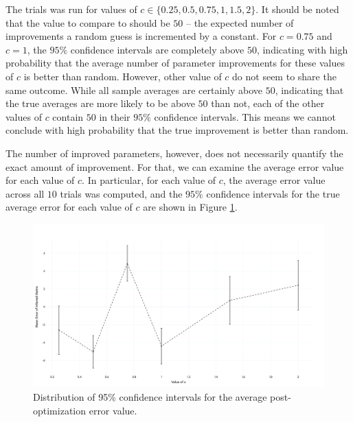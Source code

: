 \documentclass[12pt]{article}
\theoremstyle{definition}
\begin{document}
\newpage

The trials was run for values of $c \in \{0.25, 0.5, 0.75, 1, 1.5, 2\}$. It should be noted that the value to compare to should be $50$ -- the expected number of improvements a random guess is incremented by a constant. For $c=0.75$ and $c=1$, the $95\%$ confidence intervals are completely above $50$, indicating with high probability that the average number of parameter improvements for these values of $c$ is better than random. However, other value of $c$ do not seem to share the same outcome. While all sample averages are certainly above $50$, indicating that the true averages are more likely to be above $50$ than not, each of the other values of $c$ contain $50$ in their $95\%$ confidence intervals. This means we cannot conclude with high probability that the true improvement is better than random. 

The number of improved parameters, however, does not necessarily quantify the exact amount of improvement. For that, we can examine the average error value for each value of $c$. In particular, for each value of $c$, the average error value across all $10$ trials was computed, and the $95\%$ confidence intervals for the true average error for each value of $c$ are shown in Figure \ref{fig:erroBarOptimError}.

\begin{figure}[hbt!]
    \par
    \begin{center}
    \caption{Distribution of 95\% confidence intervals for the average post-optimization error value.}
    \label{fig:erroBarOptimError}
    \includegraphics[scale=0.11]{Figures/error_bars_optim.png}
    \end{center}
    \par
    \vspace{-0.25in}
    \medskip
\end{figure}
\end{document}

